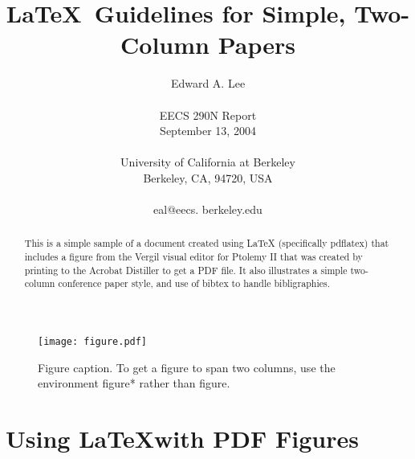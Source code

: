 \documentclass[10pt,twocolumn]{article}
\begin{document}
\title{\LaTeX\ Guidelines for Simple, Two-Column Papers}

\author{Edward A. Lee\\
\\
EECS 290N Report\\
September 13, 2004 \\
\\
University of California at Berkeley\\
Berkeley, CA, 94720, USA\\
\\
eal@eecs. berkeley.edu\\
}

\maketitle
\thispagestyle{empty}

\begin{abstract}
   This is a simple sample of a document created using \LaTeX
   (specifically pdflatex)
   that includes a figure from the Vergil visual editor for Ptolemy II
   that was created by printing to the Acrobat Distiller to get a PDF file.
   It also illustrates a simple two-column conference paper style,
   and use of bibtex to handle bibligraphies.
\end{abstract}

\begin{figure}[!b]
  \begin{center}
    \texttt{[image: figure.pdf]}
  \end{center}

  \caption{\small Figure caption. To get a figure to span two
      columns, use the environment figure* rather than figure.}
  \label{fig-label}
\end{figure}

\section{Using \LaTeX with PDF Figures}
\end{document}
